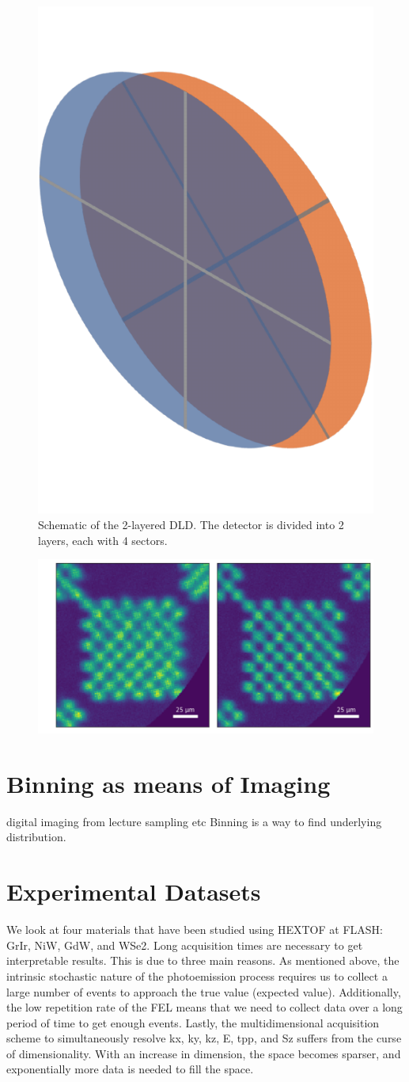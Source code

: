 \begin{figure}
    \centering
    \includegraphics[width=0.3\linewidth]{images/sectors_figure.pdf}
    \caption{Schematic of the 2-layered DLD. The detector is divided into 2 layers, each with 4 sectors.}
    \label{fig:sectors}
\end{figure}

\begin{figure}
    \includegraphics[width=1\linewidth]{images/chessy_deblurring_merged_events.png}
\end{figure}

\section{Binning as means of Imaging}
digital imaging from lecture
sampling etc
Binning is a way to find underlying distribution.

\section{Experimental Datasets}\label{section:datasets}
We look at four materials that have been studied using \gls{HEXTOF} at \gls{FLASH}: \gls{GrIr}, \gls{NiW}, \gls{GdW}, and \gls{WSe2}. Long acquisition times are necessary to get interpretable results. This is due to three main reasons. As mentioned above, the intrinsic stochastic nature of the photoemission process requires us to collect a large number of events to approach the true value (expected value). Additionally, the low repetition rate of the \gls{FEL} means that we need to collect data over a long period of time to get enough events. Lastly, the multidimensional acquisition scheme to simultaneously resolve \gls{kx}, \gls{ky}, \gls{kz}, \gls{E}, \gls{tpp}, and \gls{Sz} suffers from the curse of dimensionality. With an increase in dimension, the space becomes sparser, and exponentially more data is needed to fill the space.

